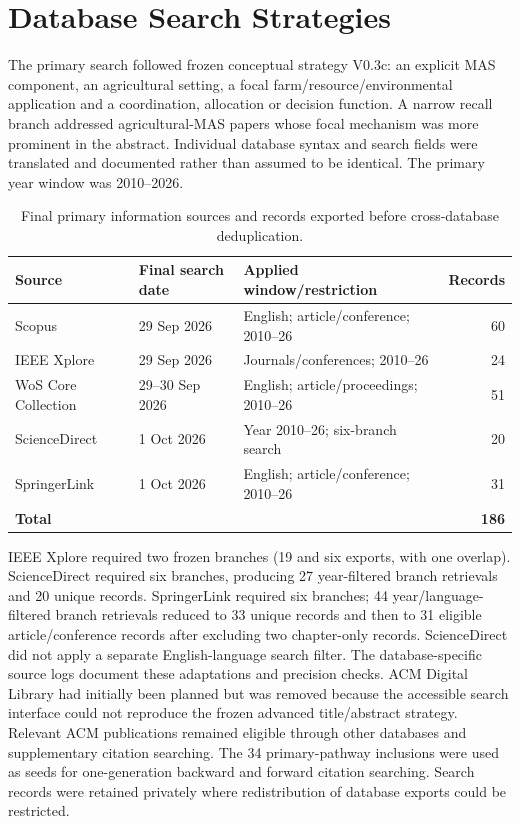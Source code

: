 \section{Database Search Strategies}
\label{app:search}
The primary search followed frozen conceptual strategy V0.3c: an explicit MAS component, an agricultural setting, a focal farm/resource/environmental application and a coordination, allocation or decision function. A narrow recall branch addressed agricultural-MAS papers whose focal mechanism was more prominent in the abstract. Individual database syntax and search fields were translated and documented rather than assumed to be identical. The primary year window was 2010--2026.
\begin{table}[htbp]\centering\small
\caption{Final primary information sources and records exported before cross-database deduplication.}\label{tab:app_search_summary}
\begin{tabularx}{\textwidth}{@{}Xllr@{}}\toprule
Source & Final search date & Applied window/restriction & Records\\\midrule
Scopus & 29 Sep 2026 & English; article/conference; 2010--26 & 60\\
IEEE Xplore & 29 Sep 2026 & Journals/conferences; 2010--26 & 24\\
WoS Core Collection & 29--30 Sep 2026 & English; article/proceedings; 2010--26 & 51\\
ScienceDirect & 1 Oct 2026 & Year 2010--26; six-branch search & 20\\
SpringerLink & 1 Oct 2026 & English; article/conference; 2010--26 & 31\\
\midrule\textbf{Total}&&&\textbf{186}\\\bottomrule\end{tabularx}\end{table}
IEEE Xplore required two frozen branches (19 and six exports, with one overlap). ScienceDirect required six branches, producing 27 year-filtered branch retrievals and 20 unique records. SpringerLink required six branches; 44 year/language-filtered branch retrievals reduced to 33 unique records and then to 31 eligible article/conference records after excluding two chapter-only records. ScienceDirect did not apply a separate English-language search filter. The database-specific source logs document these adaptations and precision checks.
ACM Digital Library had initially been planned but was removed because the accessible search interface could not reproduce the frozen advanced title/abstract strategy. Relevant ACM publications remained eligible through other databases and supplementary citation searching. The 34 primary-pathway inclusions were used as seeds for one-generation backward and forward citation searching. Search records were retained privately where redistribution of database exports could be restricted.

\clearpage
